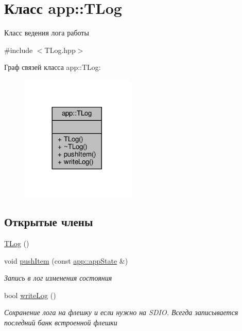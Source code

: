 \hypertarget{classapp_1_1_t_log}{}\section{Класс app\+:\+:T\+Log}
\label{classapp_1_1_t_log}


Класс ведения лога работы  




{\ttfamily \#include $<$T\+Log.\+hpp$>$}



Граф связей класса app\+:\+:T\+Log\+:\nopagebreak
\begin{figure}[H]
\begin{center}
\leavevmode
\includegraphics[width=152pt]{classapp_1_1_t_log__coll__graph}
\end{center}
\end{figure}
\subsection*{Открытые члены}
\begin{DoxyCompactItemize}
\item 
\hyperlink{classapp_1_1_t_log_a9f8a10a82504933ab909b90ea9413b65}{T\+Log} ()
\item 
void \hyperlink{classapp_1_1_t_log_a9632f9ff3d14bd24d6587f3509fbe9de}{push\+Item} (const \hyperlink{namespaceapp_a290e8080c661e52c2f685fd4af148acf}{app\+::app\+State} \&)
\begin{DoxyCompactList}\small\item\em Запись в лог изменения состояния \end{DoxyCompactList}\item 
\mbox{\label{classapp_1_1_t_log_aa28e5b94b906fcb2f8fed5f08b92e077}} 
bool \hyperlink{classapp_1_1_t_log_aa28e5b94b906fcb2f8fed5f08b92e077}{write\+Log} ()
\begin{DoxyCompactList}\small\item\em Сохранение лога на флешку и если нужно на S\+D\+IO. Всегда записывается последний банк встроенной флешки \end{DoxyCompactList}\end{DoxyCompactItemize}


